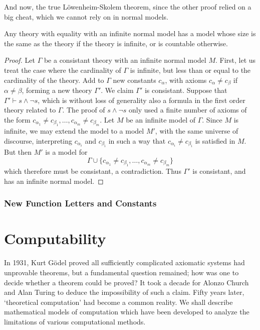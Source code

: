 And now, the true L\"{o}wenheim-Skolem theorem, since the other proof relied on a big cheat, which we cannot rely on in normal models.

\begin{corollary}
    Any theory with equality with an infinite normal model has a model whose size is the same as the theory if the theory is infinite, or is countable otherwise.
\end{corollary}
\begin{proof}
    Let $\Gamma$ be a consistant theory with an infinite normal model $M$. First, let us treat the case where the cardinality of $\Gamma$ is infinite, but less than or equal to the cardinality of the theory. Add to $\Gamma$ new constants $c_\alpha$, with axioms $c_\alpha \neq c_\beta$ if $\alpha \neq \beta$, forming a new theory $\Gamma'$. We claim $\Gamma'$ is consistant. Suppose that $\Gamma' \vdash s \wedge \neg s$, which is without loss of generality also a formula in the first order theory related to $\Gamma$. The proof of $s \wedge \neg s$ only used a finite number of axioms of the form $c_{\alpha_1} \neq c_{\beta_1}, \dots, c_{\alpha_m} \neq c_{\beta_m}$. Let $M$ be an infinite model of $\Gamma$. Since $M$ is infinite, we may extend the model to a model $M'$, with the same universe of discourse, interpreting $c_{\alpha_i}$ and $c_{\beta_i}$ in such a way that $c_{\alpha_i} \neq c_{\beta_i}$ is satisfied in $M$. But then $M'$ is a model for
    \[ \Gamma \cup \{ c_{\alpha_1} \neq c_{\beta_1}, \dots, c_{\alpha_m} \neq c_{\beta_m} \} \]
    which therefore must be consistant, a contradiction. Thus $\Gamma'$ is consistant, and has an infinite normal model.
\end{proof}

\section{New Function Letters and Constants}



\part{Computability}

In 1931, Kurt G\"{o}del proved all sufficiently complicated axiomatic systems had unprovable theorems, but a fundamental question remained; how was one to decide whether a theorem could be proved? It took a decade for Alonzo Church and Alan Turing to deduce the impossibility of such a claim. Fifty years later, `theoretical computation' had become a common reality. We shall describe mathematical models of computation which have been developed to analyze the limitations of various computational methods.

